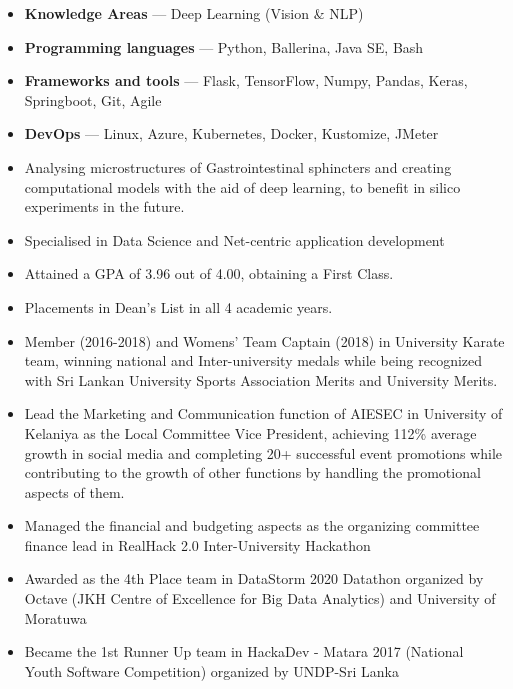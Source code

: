 \documentclass[10pt,a4paper,ragged2e,withhyper]{altacv}
\begin{document}

\begin{itemize}
    \item \textbf{Knowledge Areas } --- Deep Learning (Vision \& NLP)
    \item \textbf{Programming languages} --- Python, Ballerina, Java SE, Bash
    \item \textbf{Frameworks and tools} --- Flask, TensorFlow, Numpy, Pandas, Keras, Springboot, Git, Agile
    \item \textbf{DevOps} --- Linux, Azure, Kubernetes, Docker, Kustomize, JMeter
\end{itemize}

\pagebreak



\begin{itemize}
    \item Analysing microstructures of Gastrointestinal sphincters and creating computational models with the aid of deep learning, to benefit in silico experiments in the future.
\end{itemize}

\divider{}

\begin{itemize}
    \item Specialised in Data Science and Net-centric application development
    \item Attained a GPA of 3.96 out of 4.00, obtaining a First Class.
    \item Placements in Dean’s List in all 4 academic years.
    \item Member (2016-2018) and Womens' Team Captain (2018) in University Karate team, winning national and Inter-university medals while being recognized with Sri Lankan University Sports Association Merits and University Merits. 
    \item Lead the Marketing and Communication function of AIESEC in University of Kelaniya as the Local Committee Vice President, achieving 112\% average growth in social media and completing 20+ successful event promotions while contributing to the growth of other functions by handling the promotional aspects of them.
    \item Managed the financial and budgeting aspects as the organizing committee finance lead in RealHack 2.0 Inter-University Hackathon 
    \item Awarded as the 4th Place team in DataStorm 2020 Datathon organized by Octave (JKH Centre of Excellence for Big Data Analytics) and University of Moratuwa
    \item Became the 1st Runner Up team in HackaDev - Matara 2017 (National Youth Software Competition) organized by UNDP-Sri Lanka
\end{itemize}
\end{document}
